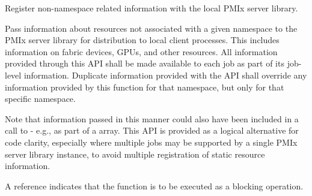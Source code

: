 \summary

Register non-namespace related information with the local \ac{PMIx} server library.

\format


\begin{arglist}
\end{arglist}

\descr

Pass information about resources not associated with a given namespace to the \ac{PMIx} server library for distribution to local client processes. This includes information on fabric devices, \acp{GPU}, and other resources. All information provided through this \ac{API} shall be made available to each job as part of its job-level information. Duplicate information provided with the  \ac{API} shall override any information provided by this function for that namespace, but only for that specific namespace.

\returnsimple

\advicermstart
Note that information passed in this manner could also have been included in a call to  - e.g., as part of a  array. This \ac{API} is provided as a logical alternative for code clarity, especially where multiple jobs may be supported by a single \ac{PMIx} server library instance, to avoid multiple registration of static resource information.

A   reference indicates that the function is to be executed as a blocking operation.
\advicermend


